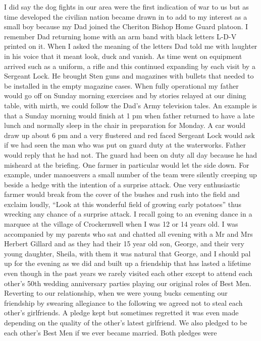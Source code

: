 I did say the dog fights in our area were the first indication of war to us but
as time developed the civilian nation became drawn in to add to my interest as
a small boy because my Dad joined the Cheriton Bishop Home Guard platoon. I
remember Dad returning home with an arm band with black letters L-D-V printed
on it. When I asked the meaning of the letters Dad told me with laughter in his
voice that it meant look, duck and vanish. As time went on equipment arrived
such as a uniform, a rifle and this continued expanding by each visit by a
Sergeant Lock. He brought Sten guns and magazines with bullets that needed to
be installed in the empty magazine cases. When fully operational my father
would go off on Sunday morning exercises and by stories relayed at our dining
table, with mirth, we could follow the Dad's Army television tales. An example
is that a Sunday morning would finish at 1 pm when father returned to have a
late lunch and normally sleep in the chair in preparation for Monday. A car
would draw up about 6 pm and a very flustered and red faced Sergeant Lock would
ask if we had seen the man who was put on guard duty at the waterworks. Father
would reply that he had not. The guard had been on duty all day because he had
misheard at the briefing. One farmer in particular would let the side down. For
example, under manoeuvers a small number of the team were silently creeping up
beside a hedge with the intention of a surprise attack. One very enthusiastic
farmer would break from the cover of the bushes and rush into the field and
exclaim loudly, ``Look at this wonderful field of growing early potatoes'' thus
wrecking any chance of a surprise attack. I recall going to an evening dance in
a marquee at the village of Crockernwell when I was 12 or 14 years old. I was
accompanied by my parents who sat and chatted all evening with a Mr and Mrs
Herbert Gillard and as they had their 15 year old son, George, and their very
young daughter, Sheila, with them it was natural that George, and I should pal
up for the evening as we did and built up a friendship that has lasted a
lifetime even though in the past years we rarely visited each other except to
attend each other's 50th wedding anniversary parties playing our original roles
of Best Men. Reverting to our relationship, when we were young bucks cementing
our friendship by swearing allegiance to the following we agreed not to steal
each other's girlfriends. A pledge kept but sometimes regretted it was even
made depending on the quality of the other's latest girlfriend. We also pledged
to be each other's Best Men if we ever became married. Both pledges were
